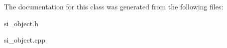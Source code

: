 The documentation for this class was generated from the following files\+:\begin{DoxyCompactItemize}
\item 
si\+\_\+object.\+h\item 
si\+\_\+object.\+cpp\end{DoxyCompactItemize}
